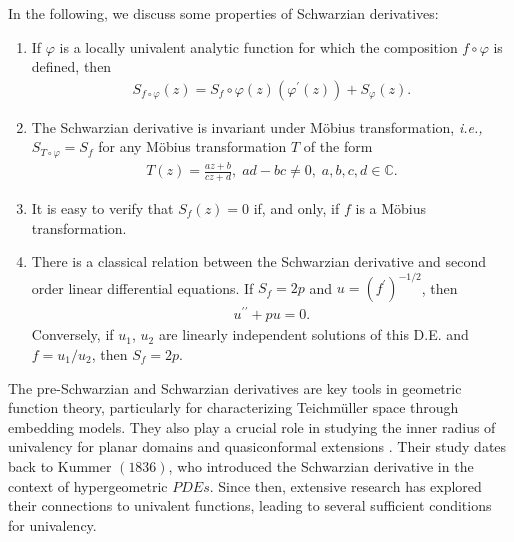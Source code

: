 \documentclass[a4paper,12pt]{amsart}
\theoremstyle{plain}
\theoremstyle{definition}
\theoremstyle{plain}
\begin{document}
In the following, we discuss some properties of Schwarzian derivatives:
\begin{enumerate}
	\item[$\bullet$] If $\varphi$ is a locally univalent analytic function for which the composition $f\circ \varphi$ is defined, then 
	\begin{align*}
		S_{f\circ \varphi}(z)=S_{f}\circ \varphi(z)\left(\varphi^{\prime}(z)\right)+S_{\varphi}(z).
	\end{align*}
	\item[$\bullet$] The Schwarzian derivative is invariant under M\"obius transformation, \emph{i.e.,} $S_{T\circ\varphi}=S_f$ for any M\"obius transformation $T$ of the form 
	\begin{align*}
		T(z)=\frac{az+b}{cz+d},\; ad-bc\neq 0,\; a, b, c, d\in\mathbb{C}.
	\end{align*}
	\item[$\bullet$] It is easy to verify that $S_f(z)=0$ if, and only, if $f$ is a M\"obius transformation. \vspace{1.2mm}
	\item[$\bullet$] There is a classical relation between the Schwarzian derivative and second order linear differential equations. If $S_f=2p$ and $u=\left(f^{\prime}\right)^{-1/2}$, then 
	\begin{align*}
		u^{\prime\prime}+pu=0.
	\end{align*}
	Conversely, if $u_1$, $u_2$ are linearly independent solutions of this D.E. and $f=u_1/u_2$, then $S_f=2p$.  
\end{enumerate}
The pre-Schwarzian and Schwarzian derivatives are key tools in geometric function theory, particularly for characterizing Teichmüller space through embedding models. They also play a crucial role in studying the inner radius of univalency for planar domains and quasiconformal extensions \cite{Lehto-1987,Lehto-JAM-1979}. Their study dates back to Kummer $(1836)$, who introduced the Schwarzian derivative in the context of hypergeometric $PDEs$. Since then, extensive research has explored their connections to univalent functions, leading to several sufficient conditions for univalency.\vspace{2mm}
\end{document}

